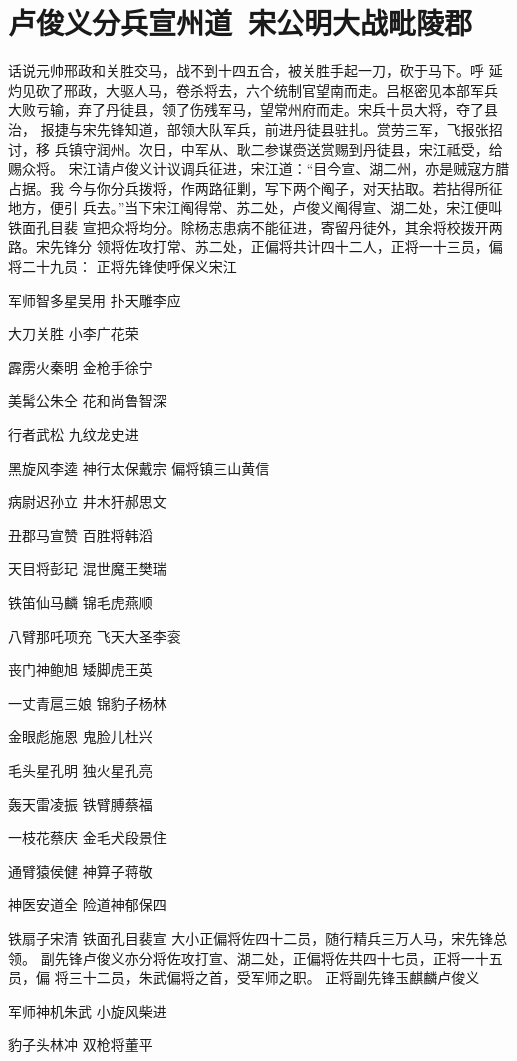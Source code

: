 \chapter{卢俊义分兵宣州道~宋公明大战毗陵郡}

话说元帅邢政和关胜交马，战不到十四五合，被关胜手起一刀，砍于马下。呼
延灼见砍了邢政，大驱人马，卷杀将去，六个统制官望南而走。吕枢密见本部军兵
大败亏输，弃了丹徒县，领了伤残军马，望常州府而走。宋兵十员大将，夺了县治，
报捷与宋先锋知道，部领大队军兵，前进丹徒县驻扎。赏劳三军，飞报张招讨，移
兵镇守润州。次日，中军从、耿二参谋赍送赏赐到丹徒县，宋江祗受，给赐众将。
宋江请卢俊义计议调兵征进，宋江道：“目今宣、湖二州，亦是贼寇方腊占据。我
今与你分兵拨将，作两路征剿，写下两个阄子，对天拈取。若拈得所征地方，便引
兵去。”当下宋江阄得常、苏二处，卢俊义阄得宣、湖二处，宋江便叫铁面孔目裴
宣把众将均分。除杨志患病不能征进，寄留丹徒外，其余将校拨开两路。宋先锋分
领将佐攻打常、苏二处，正偏将共计四十二人，正将一十三员，偏将二十九员：
正将先锋使呼保义宋江

军师智多星吴用
扑天雕李应


大刀关胜
小李广花荣


霹雳火秦明
金枪手徐宁


美髯公朱仝
花和尚鲁智深

行者武松
九纹龙史进


黑旋风李逵
神行太保戴宗
偏将镇三山黄信


病尉迟孙立
井木犴郝思文

丑郡马宣赞
百胜将韩滔


天目将彭玘
混世魔王樊瑞

铁笛仙马麟
锦毛虎燕顺


八臂那吒项充
飞天大圣李衮

丧门神鲍旭
矮脚虎王英


一丈青扈三娘
锦豹子杨林


金眼彪施恩
鬼脸儿杜兴


毛头星孔明
独火星孔亮


轰天雷凌振
铁臂膊蔡福


一枝花蔡庆
金毛犬段景住

通臂猿侯健
神算子蒋敬


神医安道全
险道神郁保四

铁扇子宋清
铁面孔目裴宣
大小正偏将佐四十二员，随行精兵三万人马，宋先锋总领。
副先锋卢俊义亦分将佐攻打宣、湖二处，正偏将佐共四十七员，正将一十五员，偏
将三十二员，朱武偏将之首，受军师之职。
正将副先锋玉麒麟卢俊义

军师神机朱武
小旋风柴进


豹子头林冲
双枪将董平


